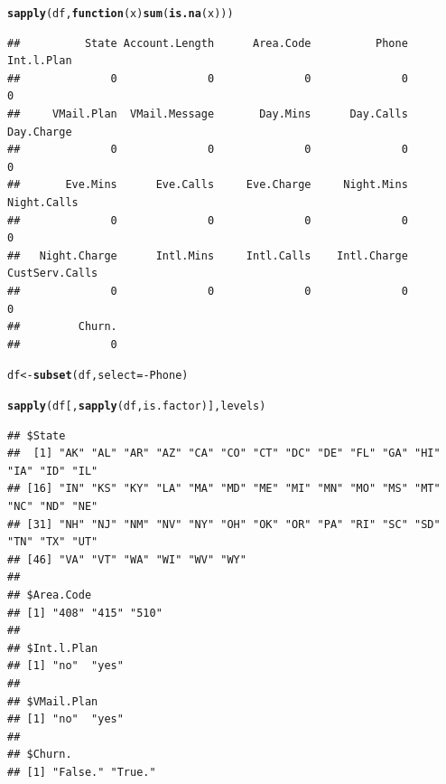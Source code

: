 \documentclass{article}\usepackage[]{graphicx}\usepackage[]{color}
\makeatletter
\newcommand{\hlopt}[1]{\textcolor[rgb]{0,0,0}{#1}}%
\newcommand{\hlstd}[1]{\textcolor[rgb]{0.345,0.345,0.345}{#1}}%
\newcommand{\hlkwa}[1]{\textcolor[rgb]{0.161,0.373,0.58}{\textbf{#1}}}%
\newcommand{\hlkwb}[1]{\textcolor[rgb]{0.69,0.353,0.396}{#1}}%
\newcommand{\hlkwc}[1]{\textcolor[rgb]{0.333,0.667,0.333}{#1}}%
\newcommand{\hlkwd}[1]{\textcolor[rgb]{0.737,0.353,0.396}{\textbf{#1}}}%
\newenvironment{kframe}{%
 \def\at@end@of@kframe{}%
 \ifinner\ifhmode%
  \def\at@end@of@kframe{\end{minipage}}%
  \begin{minipage}{\columnwidth}%
 \fi\fi%
 \def\FrameCommand##1{\hskip\@totalleftmargin \hskip-\fboxsep
 \colorbox{shadecolor}{##1}\hskip-\fboxsep
     \hskip-\linewidth \hskip-\@totalleftmargin \hskip\columnwidth}%
 \MakeFramed {\advance\hsize-\width
   \@totalleftmargin\z@ \linewidth\hsize
   \@setminipage}}%
 {\par\unskip\endMakeFramed%
 \at@end@of@kframe}
\newenvironment{knitrout}{}{} %
\makeatother
\begin{document}
\begin{knitrout}
\color{fgcolor}\begin{kframe}
\begin{alltt}
\hlkwd{sapply}\hlstd{(df,} \hlkwa{function}\hlstd{(}\hlkwc{x}\hlstd{)} \hlkwd{sum}\hlstd{(}\hlkwd{is.na}\hlstd{(x)))}
\end{alltt}
\begin{verbatim}
##          State Account.Length      Area.Code          Phone     Int.l.Plan 
##              0              0              0              0              0 
##     VMail.Plan  VMail.Message       Day.Mins      Day.Calls     Day.Charge 
##              0              0              0              0              0 
##       Eve.Mins      Eve.Calls     Eve.Charge     Night.Mins    Night.Calls 
##              0              0              0              0              0 
##   Night.Charge      Intl.Mins     Intl.Calls    Intl.Charge CustServ.Calls 
##              0              0              0              0              0 
##         Churn. 
##              0
\end{verbatim}
\end{kframe}
\end{knitrout}

\begin{knitrout}
\color{fgcolor}\begin{kframe}
\begin{alltt}
\hlstd{df} \hlkwb{<-} \hlkwd{subset}\hlstd{(df,} \hlkwc{select}\hlstd{=}\hlopt{-}\hlstd{Phone)}
\end{alltt}
\end{kframe}
\end{knitrout}

\begin{knitrout}
\color{fgcolor}\begin{kframe}
\begin{alltt}
\hlkwd{sapply}\hlstd{(df[,} \hlkwd{sapply}\hlstd{(df, is.factor)], levels)}
\end{alltt}
\begin{verbatim}
## $State
##  [1] "AK" "AL" "AR" "AZ" "CA" "CO" "CT" "DC" "DE" "FL" "GA" "HI" "IA" "ID" "IL"
## [16] "IN" "KS" "KY" "LA" "MA" "MD" "ME" "MI" "MN" "MO" "MS" "MT" "NC" "ND" "NE"
## [31] "NH" "NJ" "NM" "NV" "NY" "OH" "OK" "OR" "PA" "RI" "SC" "SD" "TN" "TX" "UT"
## [46] "VA" "VT" "WA" "WI" "WV" "WY"
## 
## $Area.Code
## [1] "408" "415" "510"
## 
## $Int.l.Plan
## [1] "no"  "yes"
## 
## $VMail.Plan
## [1] "no"  "yes"
## 
## $Churn.
## [1] "False." "True."
\end{verbatim}
\end{kframe}
\end{knitrout}
\end{document}

